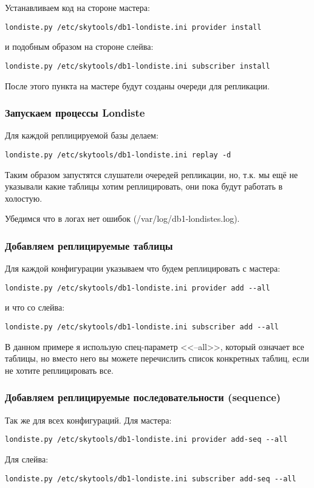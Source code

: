 Устанавливаем код на стороне мастера:
\begin{lstlisting}[label=lst:londiste10,caption=Londiste]
londiste.py /etc/skytools/db1-londiste.ini provider install
\end{lstlisting}
и подобным образом на стороне слейва:
\begin{lstlisting}[label=lst:londiste11,caption=Londiste]
londiste.py /etc/skytools/db1-londiste.ini subscriber install
\end{lstlisting}

После этого пункта на мастере будут созданы очереди для репликации.

\subsubsection{Запускаем процессы Londiste}
Для каждой реплицируемой базы делаем:
\begin{lstlisting}[label=lst:londiste12,caption=Запускаем]
londiste.py /etc/skytools/db1-londiste.ini replay -d
\end{lstlisting}

Таким образом запустятся слушатели очередей репликации, но, т.к. мы ещё не
указывали какие таблицы хотим реплицировать, они пока будут работать в холостую.

Убедимся что в логах нет ошибок (/var/log/db1-londistes.log).

\subsubsection{Добавляем реплицируемые таблицы}
Для каждой конфигурации указываем что будем реплицировать с мастера:
\begin{lstlisting}[label=lst:londiste13,caption=Добавляем реплицируемые таблицы]
londiste.py /etc/skytools/db1-londiste.ini provider add --all
\end{lstlisting}
и что со слейва:
\begin{lstlisting}[label=lst:londiste14,caption=Добавляем реплицируемые таблицы]
londiste.py /etc/skytools/db1-londiste.ini subscriber add --all
\end{lstlisting}

В данном примере я использую спец-параметр <<--all>>, который означает все таблицы,
но вместо него вы можете перечислить список конкретных таблиц, если не хотите
реплицировать все.

\subsubsection{Добавляем реплицируемые последовательности (sequence)}
Так же для всех конфигураций.
Для мастера:
\begin{lstlisting}[label=lst:londiste15,caption=Добавляем последовательности]
londiste.py /etc/skytools/db1-londiste.ini provider add-seq --all
\end{lstlisting}
Для слейва:
\begin{lstlisting}[label=lst:londiste16,caption=Добавляем реплицируемые таблицы]
londiste.py /etc/skytools/db1-londiste.ini subscriber add-seq --all
\end{lstlisting}

